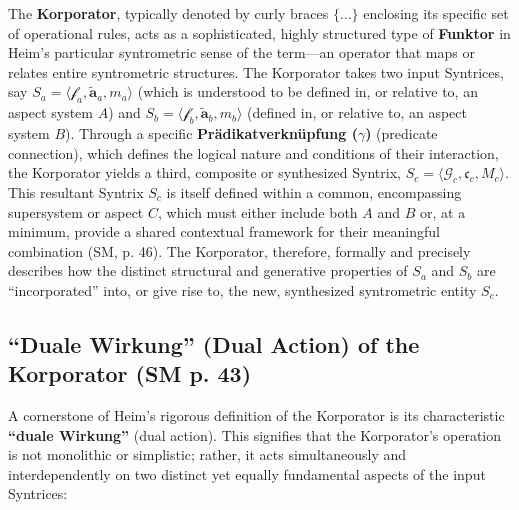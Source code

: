 \documentclass[
    12pt,              %
    a4paper,           %
    headings=normal,   %
    twoside=true,      %
    BCOR=8mm,          %
]{scrbook}
\newcommand{\q}[1]{\enquote{#1}}
\newcommand{\metrophor}{\bm{\widetilde{a}}}
\newcommand{\synkolator}{\mathcal{f}}
\newcommand{\synkolationsstufe}{m}
\begin{document}
The \textbf{Korporator}, typically denoted by curly braces \(\{ \ldots \}\) enclosing its specific set of operational rules, acts as a sophisticated, highly structured type of \textbf{Funktor} in Heim's particular syntrometric sense of the term—an operator that maps or relates entire syntrometric structures. The Korporator takes two input Syntrices, say \(S_a = \langle \synkolator_a, \metrophor_a, \synkolationsstufe_a \rangle\) (which is understood to be defined in, or relative to, an aspect system \(A\)) and \(S_b = \langle \synkolator_b, \metrophor_b, \synkolationsstufe_b \rangle\) (defined in, or relative to, an aspect system \(B\)). Through a specific \textbf{Prädikatverknüpfung (\(\gamma\))} (predicate connection), which defines the logical nature and conditions of their interaction, the Korporator yields a third, composite or synthesized Syntrix, \(S_c = \langle \mathcal{G}_c, \mathfrak{c}_c, M_c \rangle\). This resultant Syntrix \(S_c\) is itself defined within a common, encompassing supersystem or aspect \(C\), which must either include both \(A\) and \(B\) or, at a minimum, provide a shared contextual framework for their meaningful combination (SM, p. 46). The Korporator, therefore, formally and precisely describes how the distinct structural and generative properties of \(S_a\) and \(S_b\) are \q{incorporated} into, or give rise to, the new, synthesized syntrometric entity \(S_c\).

\subsection{\q{Duale Wirkung} (Dual Action) of the Korporator (SM p. 43)}
\label{sec:ch3_duale_wirkung} 

A cornerstone of Heim's rigorous definition of the Korporator is its characteristic \textbf{\q{duale Wirkung}} (dual action). This signifies that the Korporator's operation is not monolithic or simplistic; rather, it acts simultaneously and interdependently on two distinct yet equally fundamental aspects of the input Syntrices:
\end{document}
